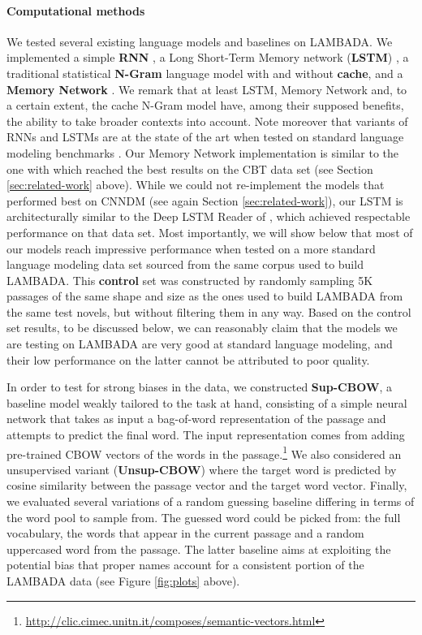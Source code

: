 \paragraph{Computational methods} We tested several existing language models and baselines on LAMBADA. We implemented a simple \textbf{RNN} \cite{Elman:1990}, a Long Short-Term Memory network (\textbf{LSTM})
\cite{Hochreiter:Schmidhuber:1997}, a traditional statistical
\textbf{N-Gram} language model \cite{Stolcke:2002} with and without
\textbf{cache}, and a \textbf{Memory Network} \cite{Sukhbaatar:etal:2015}. We remark that at least LSTM, Memory Network and, to a certain extent, the cache N-Gram model have, among their supposed benefits, the ability to take broader contexts into account. Note moreover that variants of RNNs and LSTMs are at the state of the art when tested on standard language modeling benchmarks \cite{Mikolov:2014}. Our Memory Network implementation is similar to the one with which  reached the best results on the CBT data set (see Section \ref{sec:related-work} above). While we could not re-implement the models that performed best on CNNDM (see again Section \ref{sec:related-work}), our LSTM is architecturally similar to the Deep LSTM Reader of , which achieved respectable performance on that data set. Most importantly, we will show below that most of our models reach impressive performance when tested on a more standard language modeling data set sourced from the same corpus used to build LAMBADA. This
\textbf{control} set was constructed by randomly sampling 5K passages of the same shape and size as the ones used to build LAMBADA from the same test novels, but without filtering them in any way. Based on the control set results, to be discussed below, we can reasonably claim that the models we are testing on LAMBADA are very good at standard language modeling, and their low performance on the latter cannot be attributed to poor quality.

In order to test for strong biases in the data, we constructed
\textbf{Sup-CBOW}, a baseline model weakly tailored to the task at hand, consisting of a simple neural network that takes as input a bag-of-word representation of the passage and attempts to predict the final word. The input representation comes from adding pre-trained CBOW vectors \cite{Mikolov:etal:2013b} of the words in the
passage.\footnote{\url{http://clic.cimec.unitn.it/composes/semantic-vectors.html}}
We also considered an unsupervised variant (\textbf{Unsup-CBOW}) where the target word is predicted by cosine similarity between the passage vector and the target word vector. Finally, we evaluated several variations of a random guessing baseline differing in terms of the word pool to sample from. The guessed word could be picked from: the full vocabulary, the words that appear in the current passage and a random uppercased word from the passage. The latter baseline aims at exploiting the potential bias that proper names account for a consistent portion of the LAMBADA data (see Figure \ref{fig:plots}
above).

